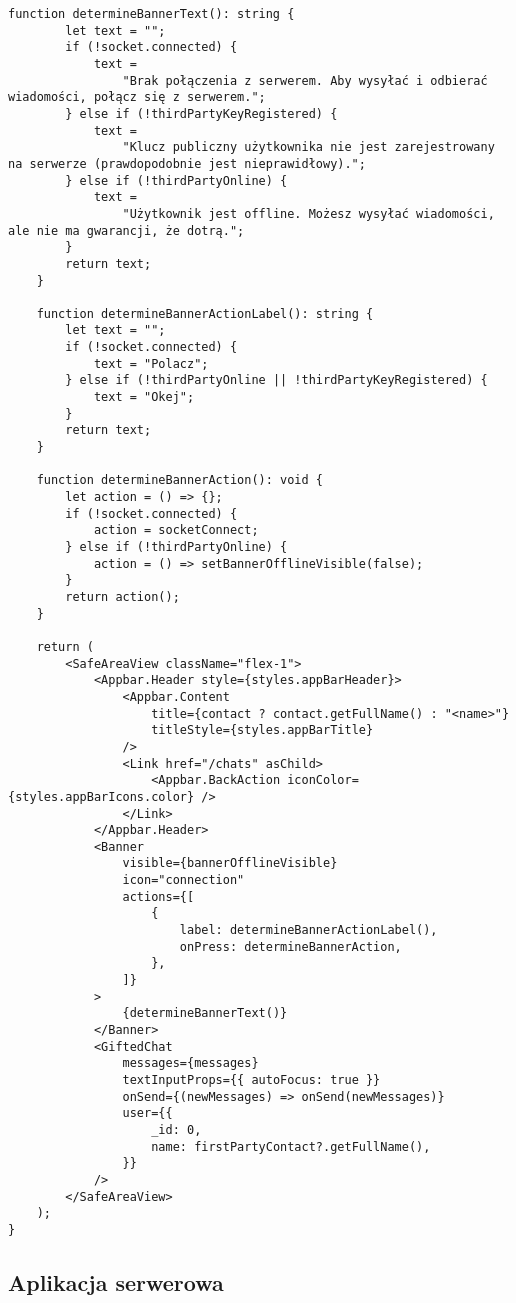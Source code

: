\documentclass[../main.tex]{subfiles}
\begin{document}
\begin{lstlisting}[caption={Implementacja ekranu czatu},label={lst:js_chat_screen}]
    function determineBannerText(): string {
        let text = "";
        if (!socket.connected) {
            text =
                "Brak połączenia z serwerem. Aby wysyłać i odbierać wiadomości, połącz się z serwerem.";
        } else if (!thirdPartyKeyRegistered) {
            text =
                "Klucz publiczny użytkownika nie jest zarejestrowany na serwerze (prawdopodobnie jest nieprawidłowy).";
        } else if (!thirdPartyOnline) {
            text =
                "Użytkownik jest offline. Możesz wysyłać wiadomości, ale nie ma gwarancji, że dotrą.";
        }
        return text;
    }

    function determineBannerActionLabel(): string {
        let text = "";
        if (!socket.connected) {
            text = "Polacz";
        } else if (!thirdPartyOnline || !thirdPartyKeyRegistered) {
            text = "Okej";
        }
        return text;
    }

    function determineBannerAction(): void {
        let action = () => {};
        if (!socket.connected) {
            action = socketConnect;
        } else if (!thirdPartyOnline) {
            action = () => setBannerOfflineVisible(false);
        }
        return action();
    }

    return (
        <SafeAreaView className="flex-1">
            <Appbar.Header style={styles.appBarHeader}>
                <Appbar.Content
                    title={contact ? contact.getFullName() : "<name>"}
                    titleStyle={styles.appBarTitle}
                />
                <Link href="/chats" asChild>
                    <Appbar.BackAction iconColor={styles.appBarIcons.color} />
                </Link>
            </Appbar.Header>
            <Banner
                visible={bannerOfflineVisible}
                icon="connection"
                actions={[
                    {
                        label: determineBannerActionLabel(),
                        onPress: determineBannerAction,
                    },
                ]}
            >
                {determineBannerText()}
            </Banner>
            <GiftedChat
                messages={messages}
                textInputProps={{ autoFocus: true }}
                onSend={(newMessages) => onSend(newMessages)}
                user={{
                    _id: 0,
                    name: firstPartyContact?.getFullName(),
                }}
            />
        </SafeAreaView>
    );
}
\end{lstlisting}

\subsection{Aplikacja serwerowa}
\end{document}

